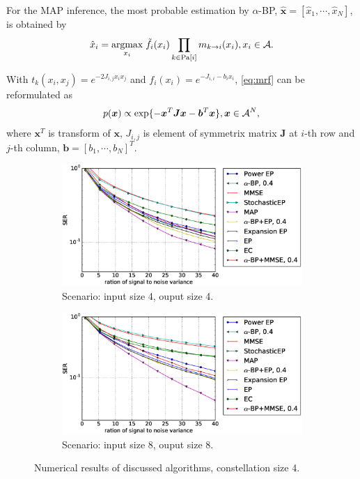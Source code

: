 \documentclass{article}
\begin{document}
For the MAP inference, the most probable estimation by $\alpha$-BP, $\hat{\bm{x}}=[\hat{x}_1, \cdots, \hat{x}_N]$, is obtained by
\begin{align}
  \hat{x}_{i} = \underset{x_i}{\operatorname{argmax}}\;\tilde{f}_i(x_i) \prod_{k\in \text{Pa}[i]} m_{k\rightarrow i}(x_i), x_i \in \mathcal{A}.
\end{align}




With $t_k(x_i, x_j) = e^{-2J_{i,j}x_i x_j}$ and $f_i(x_i) = e^{-J_{i,i}-b_i x_i}$, \autoref{eq:mrf} can be reformulated as
\begin{equation}
  p(\bm{x}) \propto \exp\{-\bm{x}^{T}\bm{J}\bm{x} - \bm{b}^{T}\bm{x}\}, \bm{x} \in \mathcal{A}^N,
\end{equation}
where $\bm{x}^{T}$ is transform of $\bm{x}$, $J_{i,j}$ is element of symmetrix matrix $\bm{J}$ at $i$-th row and $j$-th column, $\bm{b} = [b_1, \cdots, b_N]^T$.

\begin{figure}[!t]
  \begin{subfigure}{1\textwidth}
    \captionsetup[subfigure]{justification=centering}
    \centering
    \includegraphics[width=1\linewidth]{figures/ep_experiments4by4_qpsk_alpha4_.eps}
    \caption{Scenario: input size 4, ouput size 4.}
    \label{fig:compare-const4-44}
  \end{subfigure}
  \begin{subfigure}{1\textwidth}
    \includegraphics[width=1\linewidth]{figures/ep_experiments8by8_qpsk_alpha4_.eps}
    \caption{Scenario: input size 8, ouput size 8.}
    \label{fig:compare-const4-88}
  \end{subfigure}
  \caption{Numerical results of discussed algorithms, constellation
    size 4.}
  \label{fig:compare-const4}
\end{figure}
\end{document}

